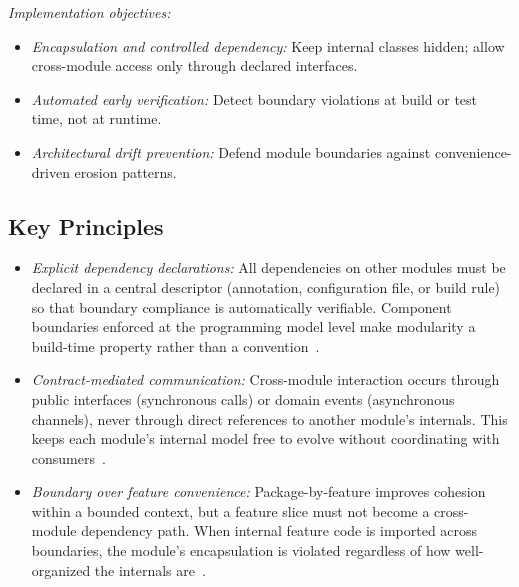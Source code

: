 \emph{Implementation objectives:}
\begin{itemize}[itemsep=8pt,topsep=2pt]
  \item \emph{Encapsulation and controlled dependency:} Keep internal classes hidden; allow cross-module access only through declared interfaces.
  \item \emph{Automated early verification:} Detect boundary violations at build or test time, not at runtime.
  \item \emph{Architectural drift prevention:} Defend module boundaries against convenience-driven erosion patterns.
\end{itemize}

\subsection*{Key Principles}
\begin{itemize}[itemsep=8pt,topsep=2pt]
  \item \emph{Explicit dependency declarations:} All dependencies on other modules must be declared in a central descriptor (annotation, configuration file, or build rule) so that boundary compliance is automatically verifiable. Component boundaries enforced at the programming model level make modularity a build-time property rather than a convention~\cite{ghemawat2023towards}.

  \item \emph{Contract-mediated communication:} Cross-module interaction occurs through public interfaces (synchronous calls) or domain events (asynchronous channels), never through direct references to another module's internals. This keeps each module's internal model free to evolve without coordinating with consumers~\cite{richardson2018microservices,khononov2024balancing}.

  \item \emph{Boundary over feature convenience:} Package-by-feature improves cohesion within a bounded context, but a feature slice must not become a cross-module dependency path. When internal feature code is imported across boundaries, the module's encapsulation is violated regardless of how well-organized the internals are~\cite{parnas1972informationhiding}.
\end{itemize}

